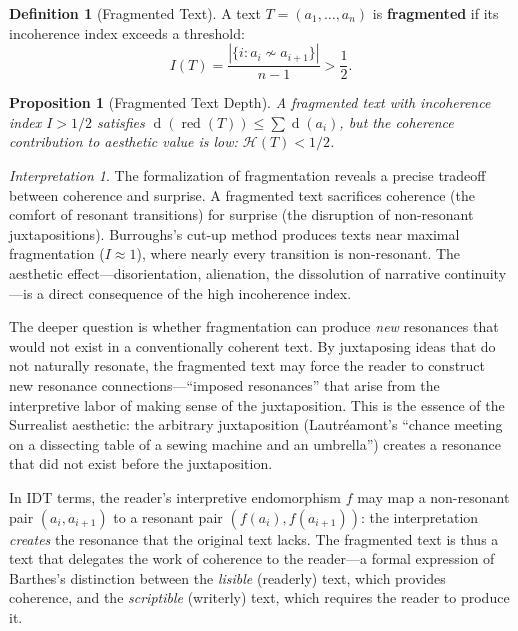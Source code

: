 \documentclass[11pt,openany]{book}
\theoremstyle{definition}
\newtheorem{definition}[axiom]{Definition}
\theoremstyle{plain}
\newtheorem{proposition}[axiom]{Proposition}
\theoremstyle{remark}
\newtheorem{interpretation}[axiom]{Interpretation}
\newcommand{\res}{\sim}                      %
\newcommand{\depth}{\operatorname{d}}       %
\begin{document}
\begin{definition}[Fragmented Text]
A text $T = (a_1, \ldots, a_n)$ is \textbf{fragmented} if its incoherence index exceeds a threshold:
\[
I(T) = \frac{|\{i : a_i \not\res a_{i+1}\}|}{n-1} > \frac{1}{2}.
\]
\end{definition}

\begin{proposition}[Fragmented Text Depth]
A fragmented text with incoherence index $I > 1/2$ satisfies $\depth(\operatorname{red}(T)) \leq \sum \depth(a_i)$, but the coherence contribution to aesthetic value is low: $\mathcal{H}(T) < 1/2$.
\end{proposition}

\begin{interpretation}
The formalization of fragmentation reveals a precise tradeoff between coherence and surprise. A fragmented text sacrifices coherence (the comfort of resonant transitions) for surprise (the disruption of non-resonant juxtapositions). Burroughs's cut-up method produces texts near maximal fragmentation ($I \approx 1$), where nearly every transition is non-resonant. The aesthetic effect---disorientation, alienation, the dissolution of narrative continuity---is a direct consequence of the high incoherence index.

The deeper question is whether fragmentation can produce \emph{new} resonances that would not exist in a conventionally coherent text. By juxtaposing ideas that do not naturally resonate, the fragmented text may force the reader to construct new resonance connections---``imposed resonances'' that arise from the interpretive labor of making sense of the juxtaposition. This is the essence of the Surrealist aesthetic: the arbitrary juxtaposition (Lautréamont's ``chance meeting on a dissecting table of a sewing machine and an umbrella'') creates a resonance that did not exist before the juxtaposition.

In IDT terms, the reader's interpretive endomorphism $f$ may map a non-resonant pair $(a_i, a_{i+1})$ to a resonant pair $(f(a_i), f(a_{i+1}))$: the interpretation \emph{creates} the resonance that the original text lacks. The fragmented text is thus a text that delegates the work of coherence to the reader---a formal expression of Barthes's distinction between the \emph{lisible} (readerly) text, which provides coherence, and the \emph{scriptible} (writerly) text, which requires the reader to produce it.
\end{interpretation}
\end{document}
